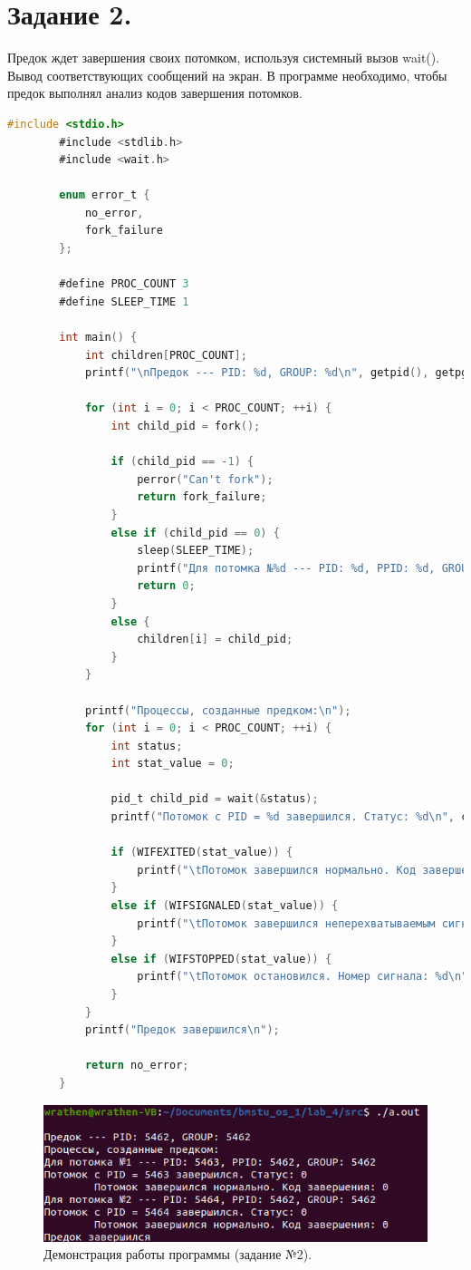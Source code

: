 \documentclass[12pt]{report}
\begin{document}
	\section*{Задание 2.}
	Предок ждет завершения своих потомком, используя системный вызов wait().
	Вывод соответствующих сообщений на экран.
	В программе необходимо, чтобы предок выполнял анализ кодов завершения потомков.
	
	\begin{lstlisting}[label=code:wait, caption=wait(), language=C]
		#include <stdio.h>
		#include <stdlib.h>
		#include <wait.h>
		
		enum error_t {
			no_error,
			fork_failure
		};
		
		#define PROC_COUNT 3
		#define SLEEP_TIME 1
		
		int main() {
			int children[PROC_COUNT];
			printf("\nПредок --- PID: %d, GROUP: %d\n", getpid(), getpgrp());
			
			for (int i = 0; i < PROC_COUNT; ++i) {
				int child_pid = fork();
				
				if (child_pid == -1) {
					perror("Can't fork");
					return fork_failure;
				}
				else if (child_pid == 0) {
					sleep(SLEEP_TIME);
					printf("Для потомка №%d --- PID: %d, PPID: %d, GROUP: %d\n", i + 1, getpid(), getppid(), getpgrp());
					return 0;
				}
				else {
					children[i] = child_pid;
				}
			}
			
			printf("Процессы, созданные предком:\n");
			for (int i = 0; i < PROC_COUNT; ++i) {
				int status;
				int stat_value = 0;
				
				pid_t child_pid = wait(&status);
				printf("Потомок с PID = %d завершился. Статус: %d\n", children[i], status);
				
				if (WIFEXITED(stat_value)) {
					printf("\tПотомок завершился нормально. Код завершения: %d\n", WEXITSTATUS(stat_value));
				}
				else if (WIFSIGNALED(stat_value)) {
					printf("\tПотомок завершился неперехватываемым сигналом. Номер сигнала: %d\n", WTERMSIG(stat_value));
				}
				else if (WIFSTOPPED(stat_value)) {
					printf("\tПотомок остановился. Номер сигнала: %d\n", WSTOPSIG(stat_value));
				}
			}
			printf("Предок завершился\n");
			
			return no_error;
		}
	\end{lstlisting}

	\begin{figure}[H]
	
		\centering
		
		\includegraphics[width=\linewidth]{img/task_02.png}
		\caption{Демонстрация работы программы (задание №2).}
		
		\label{fig:task_02}
	
	\end{figure}
\end{document}
